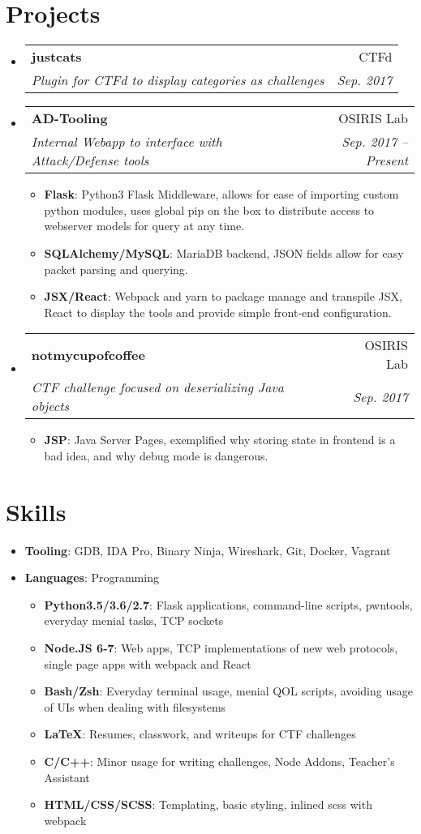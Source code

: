 \documentclass[letterpaper,10pt]{article}
\makeatletter
\newcommand{\resumeItem}[2]{
  \vspace{-1pt}
  \item\small{
    \textbf{#1}{: #2 \vspace{-2pt}}
  }
}
\newcommand{\resumeSubheading}[4]{
  \vspace{-3pt}\item
    \begin{tabular*}{0.97\textwidth}{l@{\extracolsep{\fill}}r}
      \textbf{#1} & #2 \\
      \textit{\small#3} & \textit{\small #4} \\
    \end{tabular*}\vspace{-5pt}
}
\newcommand{\resumeSubHeadingListStart}{\begin{itemize}[leftmargin=*]}
\newcommand{\resumeSubHeadingListEnd}{\end{itemize}}
\newcommand{\resumeItemListStart}{\begin{itemize}}
\newcommand{\resumeItemListEnd}{\end{itemize}\vspace{-5pt}}
\makeatother
\begin{document}
\section{Projects}
\resumeSubHeadingListStart
  \resumeSubheading
    {justcats}{CTFd}
    {Plugin for CTFd to display categories as challenges}{Sep. 2017}

  \resumeSubheading
    {AD-Tooling}{OSIRIS Lab}
    {Internal Webapp to interface with Attack/Defense tools}{Sep. 2017 -- Present}
    \resumeItemListStart
      \resumeItem{Flask}{Python3 Flask Middleware, allows for ease of importing custom python modules, uses global pip on the box to distribute access to webserver models for query at any time.}
      \resumeItem{SQLAlchemy/MySQL}{MariaDB backend, JSON fields allow for easy packet parsing and querying.}
      \resumeItem{JSX/React}{Webpack and yarn to package manage and transpile JSX, React to display the tools and provide simple front-end configuration.}
    \resumeItemListEnd

  \resumeSubheading
    {notmycupofcoffee}{OSIRIS Lab}
    {CTF challenge focused on deserializing Java objects}{Sep. 2017}
    \resumeItemListStart
      \resumeItem{JSP}{Java Server Pages, exemplified why storing state in frontend is a bad idea, and why debug mode is dangerous.}
    \resumeItemListEnd
\resumeSubHeadingListEnd

\section{Skills}
\resumeSubHeadingListStart
  \resumeItem{Tooling}{GDB, IDA Pro, Binary Ninja, Wireshark, Git, Docker, Vagrant}
  \resumeItem{Languages}{Programming}
    \resumeItemListStart
    \resumeItem{Python3.5/3.6/2.7}{Flask applications, command-line scripts, pwntools, everyday menial tasks, TCP sockets}
    \resumeItem{Node.JS 6-7}{Web apps, TCP implementations of new web protocols, single page apps with webpack and React}
    \resumeItem{Bash/Zsh}{Everyday terminal usage, menial QOL scripts, avoiding usage of UIs when dealing with filesystems}
    \resumeItem{\LaTeX}{Resumes, classwork, and writeups for CTF challenges}
    \resumeItem{C/C++}{Minor usage for writing challenges, Node Addons, Teacher's Assistant}
    \resumeItem{HTML/CSS/SCSS}{Templating, basic styling, inlined scss with webpack}
    \resumeItemListEnd
\resumeSubHeadingListEnd
\end{document}
